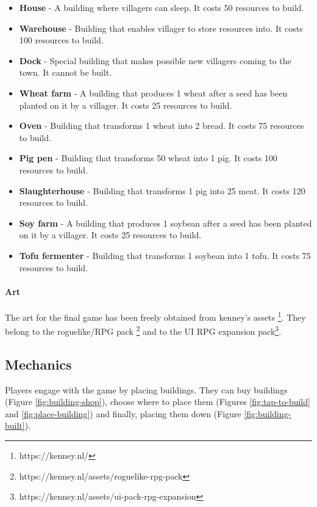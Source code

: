 \begin{itemize}
	\item \textbf{House} - A building where villagers can sleep.
		It costs 50 resources to build.
	\item \textbf{Warehouse} - Building that enables villager to store resources
		into. It costs 100 resources to build.
	\item \textbf{Dock} - Special building that makes possible new villagers
		coming to the town. It cannot be built.
	\item \textbf{Wheat farm} - A building that produces 1 wheat after a seed has been
		planted on it by a villager. It costs 25 resources to build.
	\item \textbf{Oven} - Building that transforms 1 wheat into 2 bread. It costs
		75 resources to build.
	\item \textbf{Pig pen} - Building that transforms 50 wheat into 1 pig.
		It costs 100 resources to build.
	\item \textbf{Slaughterhouse} - Building that transforms 1 pig into 25 meat.
		It costs 120 resources to build.
	\item \textbf{Soy farm} - A building that produces 1 soybean after a seed has been
		planted on it by a villager. It costs 25 resources to build.
	\item \textbf{Tofu fermenter} - Building that transforms 1 soybean into 1 tofu. It costs
		75 resources to build.
\end{itemize}

\paragraph{Art}

The art for the final game has been freely obtained from kenney's assets
\footnote{https://kenney.nl/}. They belong to the roguelike/RPG pack
\footnote{https://kenney.nl/assets/roguelike-rpg-pack} and to the UI
RPG expansion pack\footnote{https://kenney.nl/assets/ui-pack-rpg-expansion}.

\subsection{Mechanics}

Players engage with the game by placing buildings. They can buy
buildings (Figure \ref{fig:building-shop}), choose where to place
them (Figures \ref{fig:tap-to-build} and \ref{fig:place-building}) and
finally, placing them down (Figure \ref{fig:building-built}).


